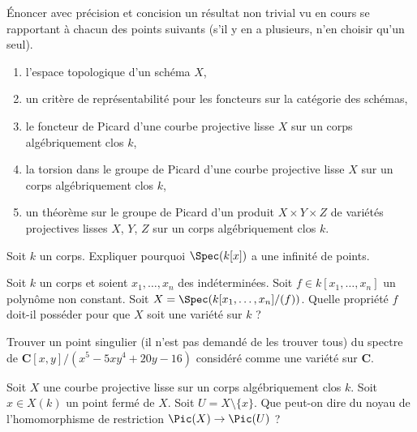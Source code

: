 \begin{exercise}[Théorèmes]
\label{exercise-results-spring-2025}
Énoncer avec précision et concision un résultat non trivial vu en cours
se rapportant à chacun des points suivants (s'il y en a plusieurs, n'en choisir qu'un seul).
\begin{enumerate}
\item l'espace topologique d'un schéma $X$,
\item un critère de représentabilité pour les foncteurs sur la catégorie des schémas,
\item le foncteur de Picard d'une courbe projective lisse $X$ sur un
corps algébriquement clos $k$,
\item la torsion dans le groupe de Picard d'une courbe projective lisse $X$ sur un
corps algébriquement clos $k$,
\item un théorème sur le groupe de Picard d'un produit $X \times Y \times Z$
de variétés projectives lisses $X$, $Y$, $Z$ sur un corps algébriquement
clos $k$.
\end{enumerate}
\end{exercise}

\begin{exercise}
\label{exercise-affine-line-infinite-nr-points}
Soit $k$ un corps. Expliquer pourquoi $\Spec(k[x])$ a une infinité de points.
\end{exercise}

\begin{exercise}
\label{exercise-hypersurface-variety}
Soit $k$ un corps et soient $x_1, \ldots, x_n$ des indéterminées.
Soit $f \in k[x_1, \ldots, x_n]$ un polynôme non constant.
Soit $X = \Spec(k[x_1, \ldots, x_n]/(f))$. Quelle propriété
$f$ doit-il posséder pour que $X$ soit une variété sur $k$ ?
\end{exercise}

\begin{exercise}
\label{exercise-find-singular-point}
Trouver un point singulier (il n'est pas demandé de les trouver tous)
du spectre de $\mathbf{C}[x, y]/(x^5 - 5xy^4 + 20y - 16)$
considéré comme une variété sur $\mathbf{C}$.
\end{exercise}

\begin{exercise}
\label{exercise-kernel-restriction-pic-curve}
Soit $X$ une courbe projective lisse sur un corps algébriquement clos
$k$. Soit $x \in X(k)$ un point fermé de $X$. Soit
$U = X \setminus \{x\}$. Que peut-on dire du noyau de
l'homomorphisme de restriction $\Pic(X) \to \Pic(U)$ ?
\end{exercise}

